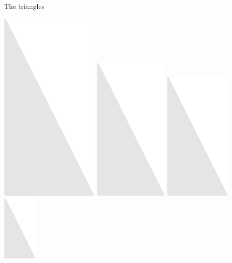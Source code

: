 \documentclass[14pt]{beamer}
\begin{document}
\begin{frame}{The triangles}
\begin{center}
            \includegraphics[scale=0.3]{figures/figure024d.pdf}\quad
            \includegraphics[scale=0.3]{figures/figure024c.pdf}\quad
            \includegraphics[scale=0.3]{figures/figure024b.pdf}\quad
            \includegraphics[scale=0.3]{figures/figure024a.pdf}\\\bigskip\bigskip


\end{center}
\end{frame}
\end{document}
